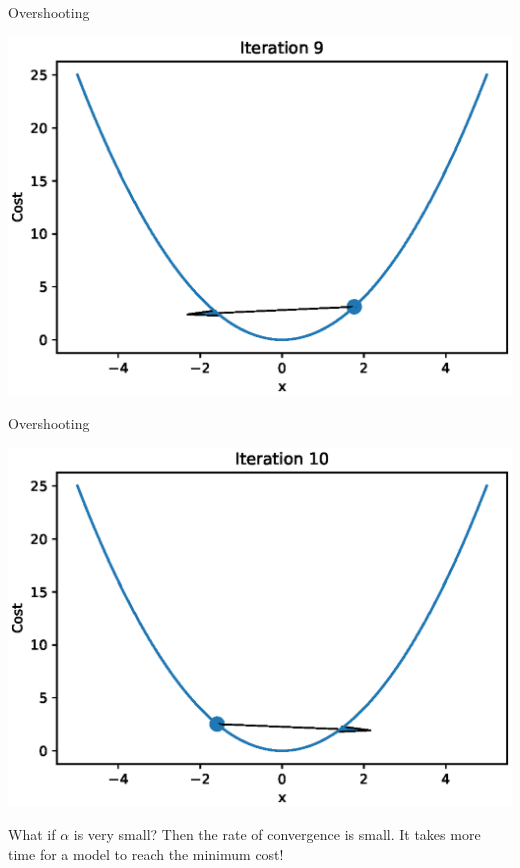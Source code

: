 \documentclass{beamer}
\begin{document}
\begin{frame}{Overshooting}
  \begin{center}
       \includegraphics[totalheight=6cm]{gradient-descent/overshooting-9.eps}
   \end{center}
\end{frame}

\begin{frame}{Overshooting}
  \begin{center}
       \includegraphics[totalheight=6cm]{gradient-descent/overshooting-10.eps}
   \end{center}
\end{frame}

\begin{frame}{What if $\alpha$ is very small?}
    Then the rate of convergence is small. It takes more time for a model to reach the minimum cost!
\end{frame}
\end{document}
